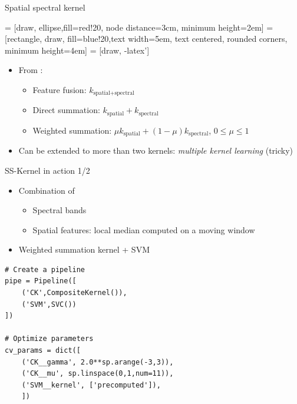 \documentclass[10pt,aspectratio=1610,,color={dvipsnames,usenames,table},table]{beamer}
\begin{document}
\begin{frame}[label={sec:org0952857}]{Spatial spectral kernel}
\begin{center}
   = [draw, ellipse,fill=red!20, node distance=3cm, minimum height=2em]
   = [rectangle, draw, fill=blue!20,text width=5em, text centered, rounded corners, minimum height=4em]
   = [draw, -latex']
\end{center}

\begin{itemize}
\item From \cite{1576697}:
\begin{itemize}
\item Feature fusion: \(k_{\text{spatial+spectral}}\)
\item Direct summation: \(k_{\text{spatial}} + k_{\text{spectral}}\)
\item Weighted summation: \(\mu k_{\text{spatial}} + (1-\mu)k_{\text{spectral}}\), \(0\leq \mu \leq 1\)
\end{itemize}
\item Can be extended to more than two kernels: \emph{multiple kernel learning} (tricky)
\end{itemize}
\end{frame}
\begin{frame}[fragile,label={sec:orge60ef6a}]{SS-Kernel in action 1/2}
 \begin{itemize}
\item Combination of
\begin{itemize}
\item Spectral bands
\item Spatial features: local median computed on a moving window
\end{itemize}
\item Weighted summation kernel + SVM
\end{itemize}

\begin{verbatim}
# Create a pipeline
pipe = Pipeline([
    ('CK',CompositeKernel()),
    ('SVM',SVC())
])

# Optimize parameters
cv_params = dict([
    ('CK__gamma', 2.0**sp.arange(-3,3)),
    ('CK__mu', sp.linspace(0,1,num=11)),
    ('SVM__kernel', ['precomputed']),
    ])
\end{verbatim}
\end{frame}
\end{document}
